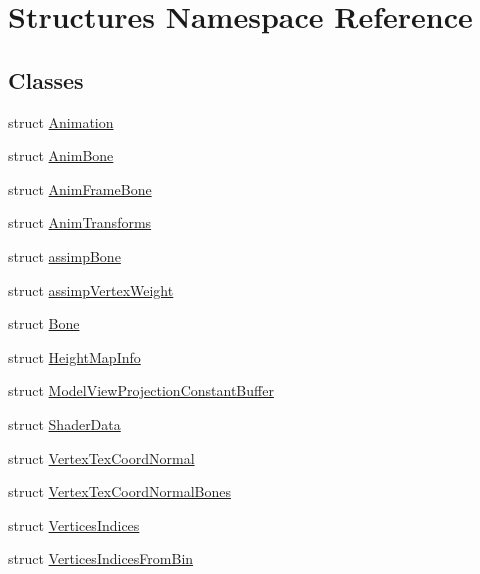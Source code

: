 \hypertarget{namespace_structures}{}\section{Structures Namespace Reference}
\label{namespace_structures}
\subsection*{Classes}
\begin{DoxyCompactItemize}
\item 
struct \mbox{\hyperlink{struct_structures_1_1_animation}{Animation}}
\item 
struct \mbox{\hyperlink{struct_structures_1_1_anim_bone}{Anim\+Bone}}
\item 
struct \mbox{\hyperlink{struct_structures_1_1_anim_frame_bone}{Anim\+Frame\+Bone}}
\item 
struct \mbox{\hyperlink{struct_structures_1_1_anim_transforms}{Anim\+Transforms}}
\item 
struct \mbox{\hyperlink{struct_structures_1_1assimp_bone}{assimp\+Bone}}
\item 
struct \mbox{\hyperlink{struct_structures_1_1assimp_vertex_weight}{assimp\+Vertex\+Weight}}
\item 
struct \mbox{\hyperlink{struct_structures_1_1_bone}{Bone}}
\item 
struct \mbox{\hyperlink{struct_structures_1_1_height_map_info}{Height\+Map\+Info}}
\item 
struct \mbox{\hyperlink{struct_structures_1_1_model_view_projection_constant_buffer}{Model\+View\+Projection\+Constant\+Buffer}}
\item 
struct \mbox{\hyperlink{struct_structures_1_1_shader_data}{Shader\+Data}}
\item 
struct \mbox{\hyperlink{struct_structures_1_1_vertex_tex_coord_normal}{Vertex\+Tex\+Coord\+Normal}}
\item 
struct \mbox{\hyperlink{struct_structures_1_1_vertex_tex_coord_normal_bones}{Vertex\+Tex\+Coord\+Normal\+Bones}}
\item 
struct \mbox{\hyperlink{struct_structures_1_1_vertices_indices}{Vertices\+Indices}}
\item 
struct \mbox{\hyperlink{struct_structures_1_1_vertices_indices_from_bin}{Vertices\+Indices\+From\+Bin}}
\end{DoxyCompactItemize}
